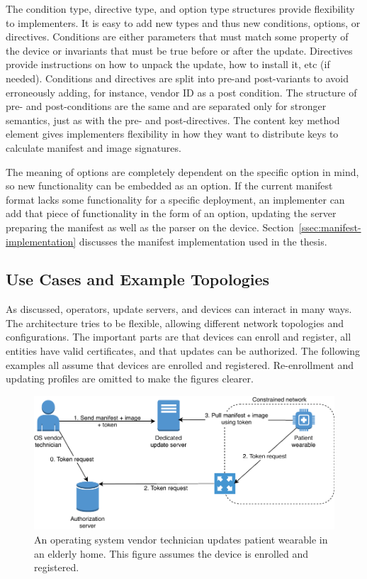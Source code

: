 \documentclass[0-thesis.tex]{subfiles}
\begin{document}
The condition type, directive type, and option type structures provide flexibility to
implementers. It is easy to add new types and thus new conditions, options, or directives.
Conditions are either parameters that must match some property of the device or invariants
that must be true before or after the update. Directives provide instructions on how to
unpack the update, how to install it, etc (if needed). Conditions and directives are split
into pre-and post-variants to avoid erroneously adding, for instance, vendor ID as a post
condition. The structure of pre- and post-conditions are the same and are separated only
for stronger semantics, just as with the pre- and post-directives. The content key method
element gives implementers flexibility in how they want to distribute keys to calculate
manifest and image signatures.

The meaning of options are completely dependent on the specific option in mind, so new
functionality can be embedded as an option. If the current manifest format lacks some
functionality for a specific deployment, an implementer can add that piece of
functionality in the form of an option, updating the server preparing the manifest as well
as the parser on the device. Section~\ref{ssec:manifest-implementation} discusses the
manifest implementation used in the thesis.

\subsection{Use Cases and Example Topologies}
\label{ssec:use-cases-examples-topologies}
As discussed, operators, update servers, and devices can interact in many ways. The
architecture tries to be flexible, allowing different network topologies and
configurations. The important parts are that devices can enroll and register, all entities
have valid certificates, and that updates can be authorized. The following examples all
assume that devices are enrolled and registered. Re-enrollment and updating profiles
are omitted to make the figures clearer.

\begin{figure}[t]
    \caption[An operating system vendor technician updates patient wearable in an elderly home.]
        {An operating system vendor technician updates patient wearable in an elderly home. This figure assumes the device is enrolled and registered.}
    \label{fig:elderly-home}
    \includegraphics{images/use-case-elderly-home.pdf}
\end{figure}
\end{document}

